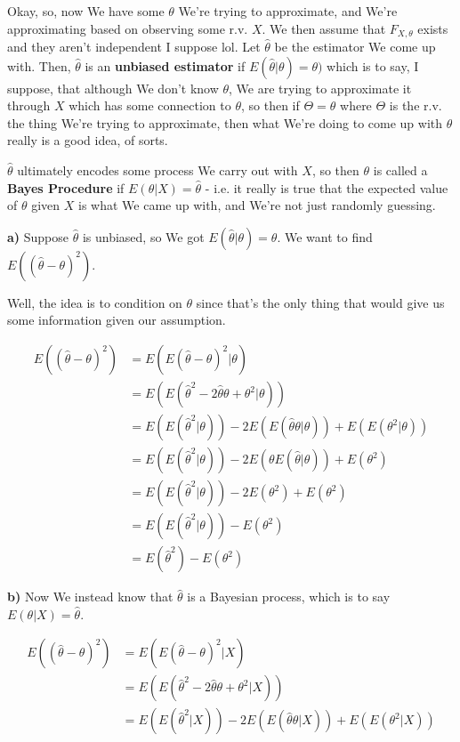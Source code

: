 \documentclass{article}
\begin{document}
			Okay, so, now We have some $\theta$ We're trying to approximate, and We're approximating based on observing some r.v. $X$. We then assume that $F_{X, \theta}$ exists and they aren't independent I suppose lol. Let $\hat{\theta}$ be the estimator We come up with. Then, $\hat{\theta}$ is an \textbf{unbiased estimator} if $E(\hat{\theta}|\theta) = \theta)$ which is to say, I suppose, that although We don't know $\theta$, We are trying to approximate it through $X$ which has some connection to $\theta$, so then if $\Theta = \theta$ where $\Theta$ is the r.v. the thing We're trying to approximate, then what We're doing to come up with $\theta$ really is a good idea, of sorts. 
			
			$\hat{\theta}$ ultimately encodes some process We carry out with $X$, so then $\theta$ is called a \textbf{Bayes Procedure} if $E(\theta|X) = \hat{\theta}$ - i.e. it really is true that the expected value of $\theta$ given $X$ is what We came up with, and We're not just randomly guessing.
			
			\textbf{a)} Suppose $\hat{\theta}$ is unbiased, so We got $E(\hat{\theta}|\theta) = \theta$. We want to find $E((\hat{\theta} - \theta)^2)$.
			
			Well, the idea is to condition on $\theta$ since that's the only thing that would give us some information given our assumption.
			
			\begin{align*}
			E((\hat{\theta} - \theta)^2) &= E(E(\hat{\theta} - \theta)^2|\theta )\\
			&= E(E(\hat{\theta}^2 - 2\hat{\theta}\theta + \theta^2 |\theta)  )\\
			&= E(E(\hat{\theta}^2|\theta)) -2 E(E(\hat{\theta}\theta |\theta)) + E(E(\theta^2|\theta))\\	
			&= E(E(\hat{\theta}^2|\theta)) -2 E(\theta E(\hat{\theta} |\theta)) + E(\theta^2)\\
			&= E(E(\hat{\theta}^2|\theta)) -2 E(\theta^2) + E(\theta^2)\\	
			&= E(E(\hat{\theta}^2|\theta)) -E(\theta^2)\\
			&= E(\hat{\theta}^2) - E(\theta^2)
			\end{align*}
		
			\textbf{b)} Now We instead know that $\hat{\theta}$ is a Bayesian process, which is to say $E(\theta|X) = \hat{\theta}$.
			
			\begin{align*}
			E((\hat{\theta} - \theta)^2) &= E(E(\hat{\theta} - \theta)^2|X )\\
			&= E(E(\hat{\theta}^2 - 2\hat{\theta}\theta + \theta^2 |X)  )\\
			&= E(E(\hat{\theta}^2|X)) -2 E(E(\hat{\theta}\theta |X)) + E(E(\theta^2|X))\\
			\end{align*}
		
\end{document}
